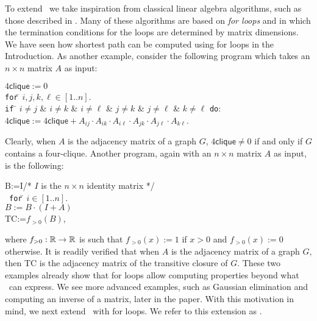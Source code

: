 To extend \lang\ we take inspiration from classical linear algebra algorithms, such as those described in \cite{num}. Many of these algorithms are based on \textit{for loops} and in which the termination conditions for the loops are determined by matrix dimensions. We have seen how shortest path can be computed using for loops in the Introduction. As another example, consider the following program which takes
an $n\times n$ matrix $A$ as input:
\begin{tabbing}
$4\mathsf{clique}:=0$\\
\texttt{for}\=\,  $i,j,k,\ell\in[1..n]$. \\
\> \texttt{if} \= $i\neq j$ \& $i\neq k$ \& $i\neq \ell$ \& $j\neq k$ \& $j\neq \ell$ \& $k\neq\ell$ \texttt{do}:\\
\> \> $4\mathsf{clique}:= 4\mathsf{clique} + A_{ij}\cdot A_{ik}\cdot A_{i\ell} \cdot A_{jk}\cdot A_{j\ell} \cdot A_{k\ell}$.  
\end{tabbing}
Clearly, when $A$ is the adjacency matrix of a graph $G$, $4\mathsf{clique}\neq 0$ if and only if $G$ contains a four-clique. Another program, again with an $n\times n$ matrix $A$ as input, is the following:
\begin{tabbing}
B:=I\quad /* $I$ is the $n\times n$ identity matrix */\\\	
\texttt{for}\=\,  $i\in[1..n]$.\\
\> $B:=B\cdot (I+A)$\quad \\
\textsf{TC}:=$f_{>0}(B)$,
\end{tabbing}
where $f_{>0}:\mathbb{R}\to\mathbb{R}$ is such that $f_{>0}(x):=1$ if $x>0$ and $f_{>0}(x):=0$ otherwise. It is readily verified that when $A$ is the adjacency matrix of a graph $G$, then \textsf{TC} is the adjacency matrix of the transitive closure of $G$. These two examples already show that for loops allow computing properties beyond what \lang\ can express.
We see more advanced examples, such as Gaussian elimination and computing an inverse of a matrix, later in the paper. With this motivation in mind, we next extend \lang\ with for loops. We refer to this extension as \langfor. 

%
%
%

